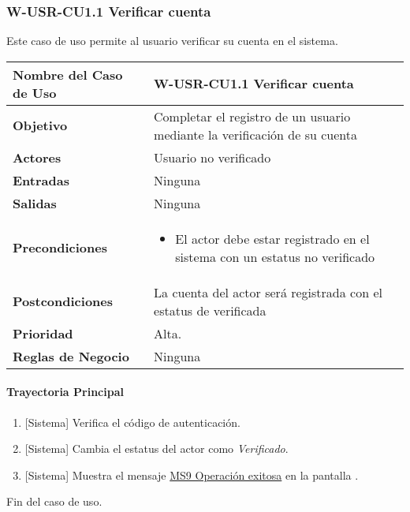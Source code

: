 \subsubsection{W-USR-CU1.1 Verificar cuenta}
Este caso de uso permite al usuario verificar su cuenta en el sistema.

\begin{longtable}{|J{5cm}|J{10.3cm}|}
	\hline
	\textbf{Nombre del Caso de Uso} &
		W-USR-CU1.1 Verificar cuenta \\ \hline
	\textbf{Objetivo} &
		Completar el registro de un usuario mediante la verificación de su cuenta \\ \hline
	\textbf{Actores} &
		Usuario no verificado \\ \hline 
	\textbf{Entradas} & 
		Ninguna \\ \hline 
	\textbf{Salidas} & 
		Ninguna \\ \hline
	\textbf{Precondiciones} &
		\begin{itemize}
		    \item El actor debe estar registrado en el sistema con un estatus no verificado
		\end{itemize} \\ \hline
	\textbf{Postcondiciones} &
	        La cuenta del actor será registrada con el estatus de verificada \\ \hline
	\textbf{Prioridad} & 
		Alta. \\ \hline
	\textbf{Reglas de Negocio} & 
		Ninguna \\ \hline

\end{longtable}

\paragraph{Trayectoria Principal}
\label{W-USR-CU1.1}
	\begin{enumerate}
	    \item {[Sistema]} Verifica el código de autenticación.
	    
	    \item {[Sistema]} Cambia el estatus del actor como \textit{Verificado}.
	    
	    \item {[Sistema]} Muestra el mensaje \hyperref[MSG9]{MS9 Operación exitosa} en la pantalla \textbf{}.
	\end{enumerate}
	Fin del caso de uso.